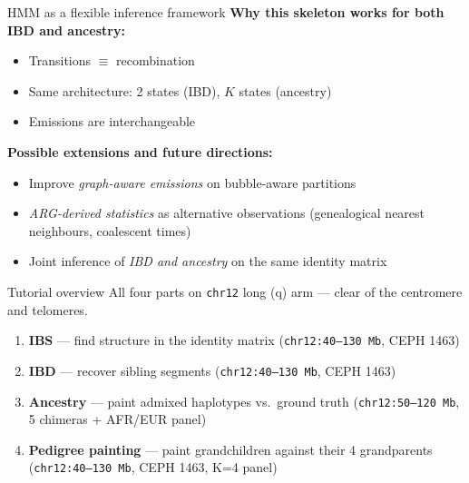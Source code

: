 \documentclass[10pt,aspectratio=169]{beamer}
\begin{document}
\begin{frame}{HMM as a flexible inference framework}
  \vspace{0.4em}
  \footnotesize
  \textbf{Why this skeleton works for both IBD and ancestry:}
  \begin{itemize}\setlength{\itemsep}{0.2em}
    \item Transitions $\equiv$ recombination
    \item Same architecture: 2 states (IBD), $K$ states (ancestry)
    \item Emissions are interchangeable
  \end{itemize}

  \vspace{0.6em}
  \textbf{Possible extensions and future directions:}
  \begin{itemize}\setlength{\itemsep}{0.3em}
    \item Improve \emph{graph-aware emissions} on bubble-aware
      partitions
    \item \emph{ARG-derived statistics} as alternative observations
      (genealogical nearest neighbours, coalescent times)
    \item Joint inference of \emph{IBD and ancestry} on the same
      identity matrix
  \end{itemize}
\end{frame}

\begin{frame}{Tutorial overview}
  \vspace{0.8em}
  \footnotesize All four parts on \texttt{chr12} long (q) arm ---
  clear of the centromere and telomeres.
  \vspace{0.6em}
  \begin{enumerate}\setlength{\itemsep}{0.4em}\normalsize
    \item \textbf{IBS} --- find structure in the identity matrix
      (\texttt{chr12:40--130\,Mb}, CEPH 1463)
    \item \textbf{IBD} --- recover sibling segments
      (\texttt{chr12:40--130\,Mb}, CEPH 1463)
    \item \textbf{Ancestry} --- paint admixed haplotypes vs.\ ground truth
      (\texttt{chr12:50--120\,Mb}, 5 chimeras + AFR/EUR panel)
    \item \textbf{Pedigree painting} --- paint grandchildren against
      their 4 grandparents (\texttt{chr12:40--130\,Mb}, CEPH 1463,
      K=4 panel)
  \end{enumerate}
\end{frame}
\end{document}
